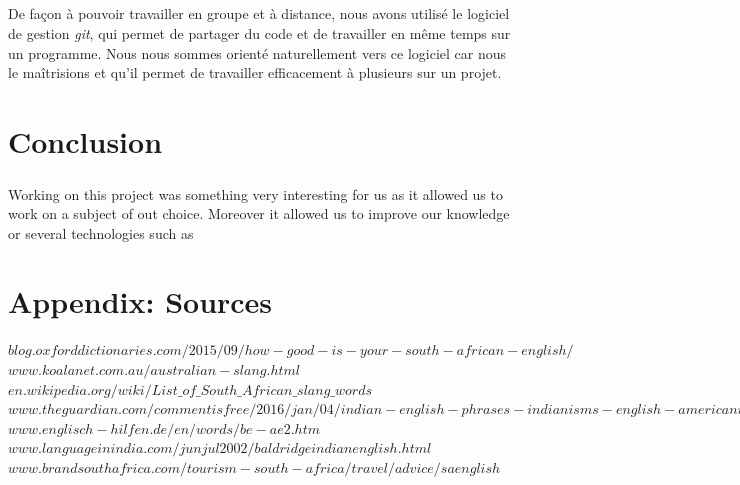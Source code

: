 \documentclass[11pt, a4paper]{report}
\begin{document}
\paragraph{}De façon à pouvoir travailler en groupe et à distance, nous avons utilisé le logiciel de gestion \textit{git}, qui permet de partager du code et de travailler en même temps sur un programme. Nous nous sommes orienté naturellement vers ce logiciel car nous le maîtrisions et qu'il permet de travailler efficacement à plusieurs sur un projet.



\chapter*{Conclusion}
\paragraph{}Working on this project was something very interesting for us as it allowed us to work on a subject of out choice. Moreover it allowed us to improve our knowledge or several technologies such as


\chapter*{Appendix: Sources}
\hspace{0.6cm}$blog.oxforddictionaries.com/2015/09/how-good-is-your-south-african-english/$\\

$www.koalanet.com.au/australian-slang.html$\\

$en.wikipedia.org/wiki/List\_of\_South\_African\_slang\_words$\\

$www.theguardian.com/commentisfree/2016/jan/04/indian-english-phrases-indianisms-english-americanisms-vocabulary$\\

$www.englisch-hilfen.de/en/words/be-ae2.htm$\\

$www.languageinindia.com/junjul2002/baldridgeindianenglish.html$\\

$www.brandsouthafrica.com/tourism-south-africa/travel/advice/saenglish$\\
\end{document}
